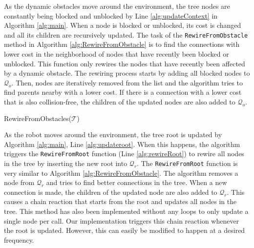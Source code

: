 As the dynamic obstacles move around the environment, the tree nodes are constantly being blocked and unblocked by Line \ref{alg:updateContext} in Algorithm \ref{alg:main}. When a node is blocked or unblocked, its cost is changed and all its children are recursively updated. The task of the {\tt RewireFromObstacle} method in Algorithm \ref{alg:RewireFromObstacle} is to find the connections with lower cost in the neighborhood of nodes that have recently been blocked or unblocked. This function only rewires the nodes that have recently been affected by a dynamic obstacle. The rewiring process starts by adding all blocked nodes to $\mathcal{Q}_o$. Then, nodes are iteratively removed from the list and the algorithm tries to find parents nearby with a lower cost. If there is a connection with a lower cost that is also collision-free, the children of the updated nodes are also added to $\mathcal{Q}_o$. 

\begin{algorithm}[tb]
 \label{alg:addblockedtolist}
\caption{RewireFromObstacles($\mathcal{T}$)}
\label{alg:RewireFromObstacle}
\end{algorithm}

As the robot moves around the environment, the tree root is updated by Algorithm \ref{alg:main}, Line \ref{alg:updateroot}. When this happens, the algorithm triggers the {\tt RewireFromRoot} function (Line \ref{alg:rewireRoot}) to rewire all nodes in the tree by inserting the new root into $\mathcal{Q}_{r}$. The {\tt RewireFromRoot} function is very similar to Algorithm \ref{alg:RewireFromObstacle}. The algorithm removes a node from $\mathcal{Q}_{r}$ and tries to find better connections in the tree. When a new connection is made, the children of the updated node are also added to $\mathcal{Q}_{r}$. This causes a chain reaction that starts from the root and updates all nodes in the tree. This method has also been implemented without any loops to only update a single node per call. Our implementation triggers this chain reaction whenever the root is updated. However, this can easily be modified to happen at a desired frequency.




